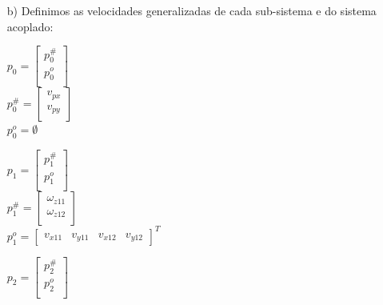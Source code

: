 \documentclass[12pt,a4paper]{article}
\begin{document}
\begin{itemize}
\begin{itemize}
\begin{multicols}{3}
	$ \mathsf{q}^{\#} = q_0 $ \\
	
	$ \mathsf{q}^o =
	\begin{bmatrix}
	q_1 \\
	q_2 \\
	\end{bmatrix} $
	\end{multicols}
	
	\item[b)] Definimos as velocidades generalizadas de cada sub-sistema e do sistema acoplado:
	
	\begin{multicols}{3}
	$ p_0 =
	\begin{bmatrix}
	p_0^{\#} \\
	p_0^o \\
	\end{bmatrix}
	$ \\
	
	$ p_0^{\#} =
	\begin{bmatrix}
	v_{px} \\
	v_{py} \\
	\end{bmatrix}
	$ \\
	
	$ p_0^o = \emptyset$
	\end{multicols}
	
	\begin{multicols}{3}
	$ p_1 =
	\begin{bmatrix}
	p_1^{\#} \\
	p_1^o \\
	\end{bmatrix}
	$ \\
	
	$ p_1^{\#} =
	\begin{bmatrix}
	\omega_{z11} \\
	\omega_{z12} \\
	\end{bmatrix}
	$ \\
	
	$ p_1^o = 
	\begin{bmatrix}
	v_{x11} &
	v_{y11} &
	v_{x12} &
	v_{y12} 
	\end{bmatrix}^T		
	$
	\end{multicols}
	
	\begin{multicols}{3}
	$ p_2 =
	\begin{bmatrix}
	p_2^{\#} \\
	p_2^o \\
	\end{bmatrix}
	$ \\
	

\end{multicols}
\end{itemize}
\end{itemize}
\end{document}
